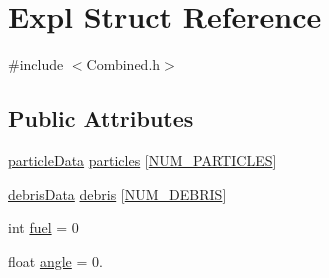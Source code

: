 \hypertarget{structExpl}{\section{Expl Struct Reference}
\label{structExpl}
}


{\ttfamily \#include $<$Combined.\-h$>$}

\subsection*{Public Attributes}
\begin{DoxyCompactItemize}
\item 
\hyperlink{structparticleData}{particle\-Data} \hyperlink{structExpl_aae5280abce86978acbbac2167b0720bd}{particles} \mbox{[}\hyperlink{CompCombined_8h_a75cbc112dce4b21c13fe7bb671accab1}{N\-U\-M\-\_\-\-P\-A\-R\-T\-I\-C\-L\-E\-S}\mbox{]}
\item 
\hyperlink{structdebrisData}{debris\-Data} \hyperlink{structExpl_a5b0ae442e25ea6bd2b20e8d84b83a4ce}{debris} \mbox{[}\hyperlink{CompCombined_8h_ac62c9bcd0a65a564732dfa7fc84e238c}{N\-U\-M\-\_\-\-D\-E\-B\-R\-I\-S}\mbox{]}
\item 
int \hyperlink{structExpl_a36661564535ffc28e3abe35daab49572}{fuel} = 0
\item 
float \hyperlink{structExpl_ab2bb9e602db2eb154e8808706b9058d1}{angle} = 0.
\end{DoxyCompactItemize}


